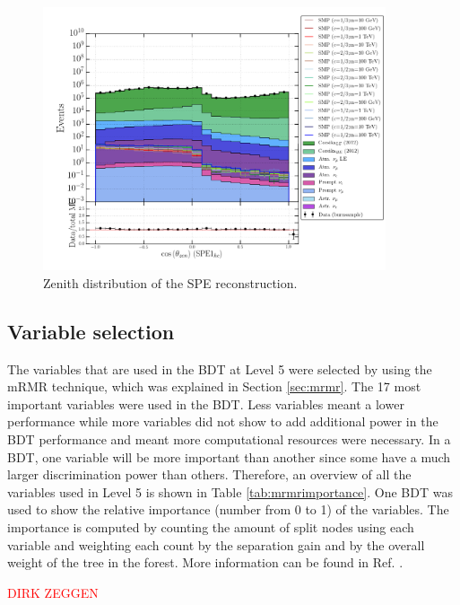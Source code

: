 \begin{figure}
\centering
\includegraphics[width=0.9\textwidth]{chapter8/img/1D_stack_spefit1_hc_coszenith_foefelare}
\caption{Zenith distribution of the SPE reconstruction.}
\label{fig:remainingvariableszenith}
\end{figure}




\subsection{Variable selection}
The variables that are used in the BDT at Level 5 were selected by using the mRMR technique, which was explained in Section \ref{sec:mrmr}. The 17 most important variables were used in the BDT. Less variables meant a lower performance while more variables did not show to add additional power in the BDT performance and meant more computational resources were necessary. In a BDT, one variable will be more important than another since some have a much larger discrimination power than others. Therefore, an overview of all the variables used in Level 5 is shown in Table \ref{tab:mrmrimportance}. One BDT was used to show the relative importance (number from 0 to 1) of the variables. The importance is computed by counting the amount of split nodes using each
variable and weighting each count by the separation gain and by the overall weight of the tree in the forest. More information can be found in Ref. \cite{pybdturl}.

\textcolor{red}{DIRK ZEGGEN}

